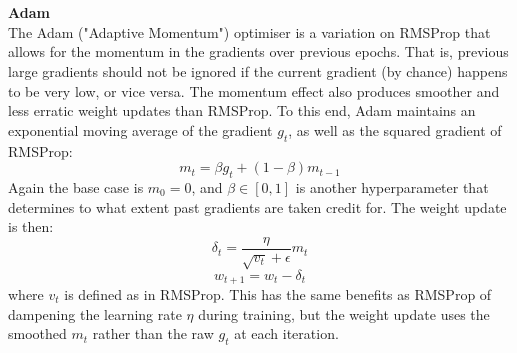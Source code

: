 \documentclass[11pt]{article} %
\theoremstyle{plain}
\theoremstyle{definition}
\begin{document}
\\
\\
\noindent
\textbf{Adam}
\\
\noindent
The Adam ("Adaptive Momentum") optimiser is a variation on RMSProp that allows for the momentum in the gradients over previous epochs. That is, previous large gradients should not be ignored if the current gradient (by chance) happens to be very low, or vice versa. The momentum effect also produces smoother and less erratic weight updates than RMSProp. To this end, Adam maintains an exponential moving average of the gradient \(g_t\), as well as the squared gradient of RMSProp:
\[ m_t = \beta g_t + (1-\beta)m_{t-1} \]
Again the base case is \(m_0=0\), and \( \beta \in [0,1]\) is another hyperparameter that determines to what extent past gradients are taken credit for. The weight update is then:
\[ \delta_t  = \dfrac{\eta}{\sqrt{v_t} + \epsilon} m_t \]
\[ w_{t+1} = w_t - \delta_t \]
where \(v_t\) is defined as in RMSProp. This has the same benefits as RMSProp of dampening the learning rate \(\eta\) during training, but the weight update uses the smoothed \(m_t\) rather than the raw \(g_t\) at each iteration. 
\end{document}
